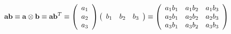 \documentclass[a4paper]{article}
\begin{document}
\pagestyle{empty}
\begin{equation*}
{\bf{ab}} \equiv
{\bf{a}} \otimes {\bf{b}} \equiv
{\bf{ab}}^T \equiv
\left(
    \begin{array}{c}
       a_1 \\ a_2 \\ a_3 
    \end{array}
\right)
\left(
    \begin{array}{ccc}
       b_1 & b_2 & b_3 \\
    \end{array}
\right) 
\equiv
\left(
    \begin{array}{ccc}
       a_1b_1 & a_1b_2 & a_1b_3  \\
       a_2b_1 & a_2b_2 & a_2b_3  \\
       a_3b_1 & a_3b_2 & a_3b_3  \\  
    \end{array}
\right)
\end{equation*}
\end{document}
